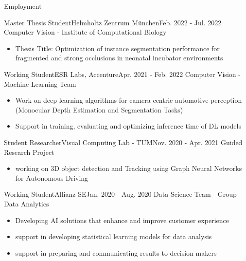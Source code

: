 \documentclass[]{mcdowellcv}
\begin{document}
	\begin{cvsection}{Employment}
	\begin{cvsubsection}{Master Thesis Student}{Helmholtz Zentrum München}{Feb. 2022 - Jul. 2022}
			Computer Vision - Institute of Computational Biology		
			\begin{itemize}	
			\item Thesis Title: Optimization of instance segmentation performance for fragmented and strong occlusions in neonatal incubator environments
			\end{itemize}
		\end{cvsubsection}
		\begin{cvsubsection}{Working Student}{ESR Labs, Accenture}{Apr. 2021 - Feb. 2022}
			Computer Vision - Machine Learning Team			
			\begin{itemize}
				\item Work on deep learning algorithms for camera centric automotive perception (Monocular Depth Estimation and Segmentation Tasks)
				\item Support in training, evaluating and optimizing inference time of DL models 
			\end{itemize}
		\end{cvsubsection}
		
		\begin{cvsubsection}{Student Researcher}{Visual Computing Lab - TUM}{Nov. 2020 -  Apr. 2021}
			Guided Research Project
			\begin{itemize}
				\item working on 3D object detection and Tracking using Graph Neural Networks for Autonomous Driving
			\end{itemize}
		\end{cvsubsection}

		
		\begin{cvsubsection}{Working Student}{Allianz SE}{Jan. 2020 -  Aug. 2020}
			Data Science Team - Group Data Analytics
			\begin{itemize}
				\item Developing AI solutions that enhance and improve customer experience
				\item support in developing statistical learning models for data analysis
				\item support in preparing and communicating results to decision makers
			\end{itemize}
		\end{cvsubsection}
		

\end{cvsection}
\end{document}
